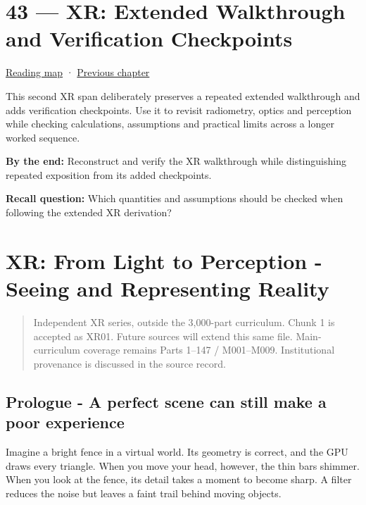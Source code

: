 \hypertarget{04-visual-computing-ii-ch043}{}
\chapter{43 --- XR: Extended Walkthrough and Verification Checkpoints}\label{04-visual-computing-ii-ch043-xr-extended-walkthrough-and-verification-checkpoints}

\hyperref[volume-reading-map]{Reading map} · \hyperref[04-visual-computing-ii-ch042-xr-radiometry-optics-and-perception]{Previous chapter}

This second XR span deliberately preserves a repeated extended walkthrough and adds verification checkpoints. Use it to revisit radiometry, optics and perception while checking calculations, assumptions and practical limits across a longer worked sequence.

\textbf{By the end:} Reconstruct and verify the XR walkthrough while distinguishing repeated exposition from its added checkpoints.

\textbf{Recall question:} Which quantities and assumptions should be checked when following the extended XR derivation?

\chapter{XR: From Light to Perception - Seeing and Representing Reality}\label{04-visual-computing-ii-ch043-xr-from-light-to-perception---seeing-and-representing-reality}

\begin{quote}
Independent XR series, outside the 3,000-part curriculum. Chunk 1 is accepted as XR01. Future sources will extend this same file. Main-curriculum coverage remains Parts 1--147 / M001--M009. Institutional provenance is discussed in the source record.
\end{quote}

\section{Prologue - A perfect scene can still make a poor experience}\label{04-visual-computing-ii-ch043-prologue---a-perfect-scene-can-still-make-a-poor-experience}

Imagine a bright fence in a virtual world. Its geometry is correct, and the GPU draws every triangle. When you move your head, however, the thin bars shimmer. When you look at the fence, its detail takes a moment to become sharp. A filter reduces the noise but leaves a faint trail behind moving objects.

